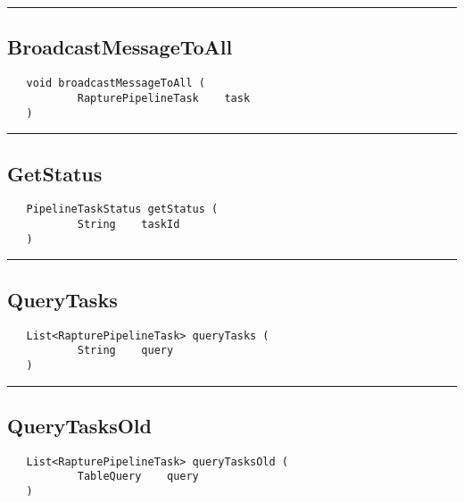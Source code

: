 \rule{15cm}{2pt}
\subsection{BroadcastMessageToAll}
\label{Api:BroadcastMessageToAll}
\begin{verbatim}
   void broadcastMessageToAll (
           RapturePipelineTask    task
   )
\end{verbatim}



\rule{15cm}{2pt}
\subsection{GetStatus}
\label{Api:GetStatus}
\begin{verbatim}
   PipelineTaskStatus getStatus (
           String    taskId
   )
\end{verbatim}



\rule{15cm}{2pt}
\subsection{QueryTasks}
\label{Api:QueryTasks}
\begin{verbatim}
   List<RapturePipelineTask> queryTasks (
           String    query
   )
\end{verbatim}



\rule{15cm}{2pt}
\subsection{QueryTasksOld}
\label{Api:QueryTasksOld}
\begin{verbatim}
   List<RapturePipelineTask> queryTasksOld (
           TableQuery    query
   )
\end{verbatim}



